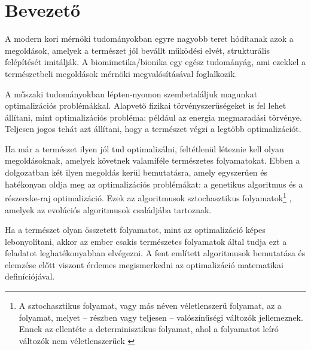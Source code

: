 \chapter{Bevezető}

A modern kori mérnöki tudományokban egyre nagyobb teret hódítanak azok a megoldások, amelyek a természet jól bevállt működési elvét, strukturális felépítését imitálják. A biomimetika/bionika egy egész tudományág, ami ezekkel a természetbeli megoldások mérnöki megvalósításával foglalkozik.

A műszaki tudományokban lépten-nyomon szembetaláljuk magunkat optimalizációs problémákkal. Alapvető fizikai törvényszerűségeket is fel lehet állítani, mint optimalizációs probléma: például az energia megmaradási törvénye. Teljesen jogos tehát azt állítani, hogy a természet végzi a legtöbb optimalizációt.

Ha már a természet ilyen jól tud optimalizálni, feltétlenül léteznie kell olyan megoldásoknak, amelyek követnek valamiféle természetes folyamatokat. Ebben a dolgozatban két ilyen megoldás kerül bemutatásra, amely egyszerűen és hatékonyan oldja meg az optimalizációs problémákat: a genetikus algoritmus és a részecske-raj optimalizáció. Ezek az algoritmusok sztochasztikus folyamatok\footnote{A sztochasztikus folyamat, vagy más néven véletlenszerű folyamat, az a folyamat, melyet -- részben vagy teljesen -- valószínűségi változók jellemeznek. Ennek az ellentéte a determinisztikus folyamat, ahol a folyamatot leíró változók nem véletlenszerűek \parencite{wikipedia2020}} , amelyek az evolúciós algoritmusok családjába tartoznak.

Ha a természet olyan összetett folyamatot, mint az optimalizáció képes lebonyolítani, akkor az ember csakis természetes folyamatok által tudja ezt a feladatot leghatékonyabban elvégezni. A fent említett algoritmusok bemutatása és elemzése előtt viszont érdemes megismerkedni az optimalizáció matematikai definíciójával.